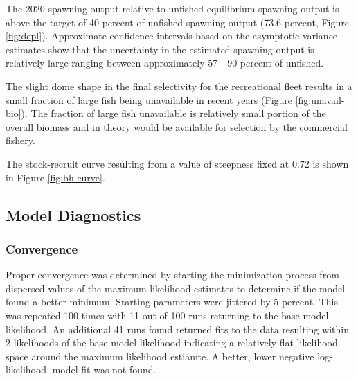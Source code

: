 \documentclass[11pt,
  english,
  a4paper,
]{article}
\begin{document}
The 2020 spawning output relative to unfished equilibrium spawning output is above the target of 40 percent of unfished spawning output (73.6 percent, Figure \ref{fig:depl}). Approximate confidence intervals based on the asymptotic variance estimates show that the uncertainty in the estimated spawning output is relatively large ranging between approximately 57 - 90 percent of unfished.

\leavevmode\tagmcend\tagstructend\par


The slight dome shape in the final selectivity for the recreational fleet results in a small fraction of large fish being unavailable in recent years (Figure \ref{fig:unavail-bio}). The fraction of large fish unavailable is relatively small portion of the overall biomass and in theory would be available for selection by the commercial fishery.

\leavevmode\tagmcend\tagstructend\par


The stock-recruit curve resulting from a value of steepness fixed at 0.72 is shown in Figure \ref{fig:bh-curve}.

\leavevmode\tagmcend\tagstructend\par


\hypertarget{model-diagnostics}{%
\subsection{Model Diagnostics}\label{model-diagnostics}}

\leavevmode\tagmcend\tagstructend


\hypertarget{convergence}{%
\subsubsection{Convergence}\label{convergence}}

\leavevmode\tagmcend\tagstructend


Proper convergence was determined by starting the minimization process from dispersed values of the maximum likelihood estimates to determine if the model found a better minimum. Starting parameters were jittered by 5 percent. This was repeated 100 times with 11 out of 100 runs returning to the base model likelihood. An additional 41 runs found returned fits to the data resulting within 2 likelihoods of the base model likelihood indicating a relatively flat likelihood space around the maximum likelihood estiamte. A better, lower negative log-likelihood, model fit was not found.
\end{document}
